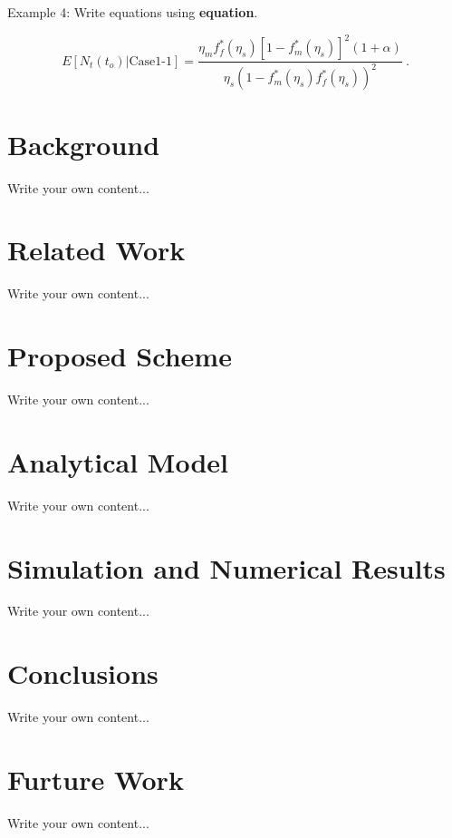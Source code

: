 Example 4: Write equations using \textbf{equation}.
      
\begin{equation}
	E[N_{t}(t_{o}) | \text{Case1-1} ] =
	\frac{ \eta_{m}f^{*}_{f}(\eta_{s})[1-f^{*}_{m}(\eta_{s})]^{2} (1+\alpha) } 
	{ \eta_{s} (1- f^{*}_{m}(\eta_{s})f^{*}_{f}(\eta_{s}))^{2} } \ .
\end{equation}


\chapter{Background}
\label{sec:Background}
Write your own content...
	
\chapter{Related Work}
\label{relatedwork}
Write your own content...	

\chapter{Proposed Scheme}
\label{proposedscheme}
Write your own content...

\chapter{Analytical Model}
\label{analyticalmodel}
Write your own content...	

\chapter{Simulation and Numerical Results}
\label{simulationandnumericalresults}
Write your own content...
	
\chapter{Conclusions}
\label{conclusion}
Write your own content...
	
\chapter{Furture Work}
Write your own content...





